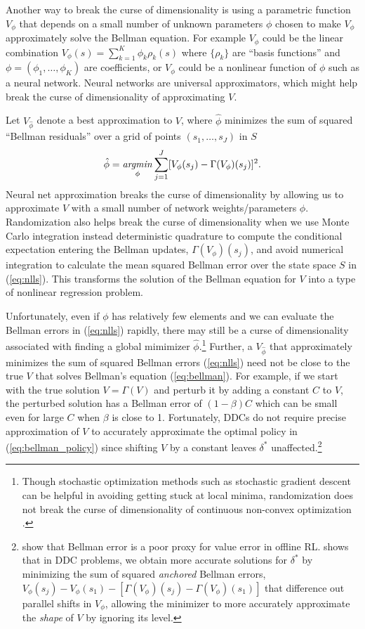 Another way to break the curse of dimensionality \citep{BD:1959} is using a parametric function $V_\phi$  
that depends on a small number of unknown parameters $\phi$ chosen to make $V_\phi$ approximately
solve the Bellman equation. For example $V_\phi$ could be the linear combination
$V_\phi(s)=\sum_{k=1}^K \phi_k \rho_k(s)$ where $\{\rho_k\}$ are ``basis functions'' and $\phi=(\phi_1,\ldots,\phi_K)$ are
coefficients, or $V_\phi$ could be a nonlinear function of $\phi$ such as a neural network.
Neural networks are universal approximators, which might help break the curse of dimensionality of approximating $V$.

Let $V_{\hat\phi}$ denote 
a best approximation to $V$, where $\hat\phi$  
minimizes the sum of squared ``Bellman residuals'' over a grid of points $(s_1,\ldots,s_J)$ in $S$
\begin{equation}
      \hat\phi = \mathop{\it argmin}_{\phi} \sum_{j=1}^J [V_\phi(s_j)- \Gamma(V_\phi)(s_j)]^2.
\label{eq:nlls}
\end{equation}
Neural net approximation breaks the curse of dimensionality by allowing us to approximate $V$ with a small number
of network weights/parameters $\phi$.  Randomization also helps break the curse of dimensionality when we
use  Monte Carlo integration instead deterministic quadrature to compute the conditional expectation entering the Bellman updates,  
$\Gamma(V_\phi)(s_j)$, and avoid numerical integration to calculate the mean squared Bellman error over the state
space $S$ in (\ref{eq:nlls}). This transforms the solution of the Bellman equation for $V$ into a type of nonlinear regression problem.

Unfortunately, even if $\phi$ has relatively few elements and we can evaluate the Bellman errors in (\ref{eq:nlls})
rapidly, there may still be a curse of dimensionality associated with finding a global mimimizer $\hat\phi$.\footnote{\footnotesize 
Though stochastic optimization methods such as stochastic gradient descent can be helpful in avoiding getting stuck
at local minima, randomization does not break the curse of dimensionality of continuous non-convex optimization \citep{yn:1976}.}
Further, a $V_{\hat\phi}$ that approximately minimizes the sum of squared Bellman errors (\ref{eq:nlls})
need not be close to the true $V$ that solves Bellman's equation (\ref{eq:bellman}). For example, if we start with 
the true solution $V=\Gamma(V)$ and perturb it by adding a constant $C$ to $V$, the perturbed solution has a Bellman error of
$(1-\beta)C$ which can be small even for large $C$ when $\beta$ is close to 1.
Fortunately, DDCs do not require
precise approximation of $V$ to accurately approximate the optimal policy in  (\ref{eq:bellman_policy}) since shifting $V$
by a constant leaves $\delta^*$ unaffected.\footnote{\footnotesize \citet{fujimoto22a} show that Bellman error is a poor proxy for value error in offline RL. 
\citet{Nguyen:2025} shows that in DDC problems, we obtain
more accurate solutions for $\delta^*$ by minimizing the sum of squared {\it anchored\/} Bellman errors, 
$V_\phi(s_j)-V_\phi(s_1)-[\Gamma(V_\phi)(s_j)-\Gamma(V_\phi)(s_1)]$ that difference out
parallel shifts in $V_\phi$, allowing the minimizer to more accurately approximate the {\it shape\/} of $V$ by ignoring its level.}



